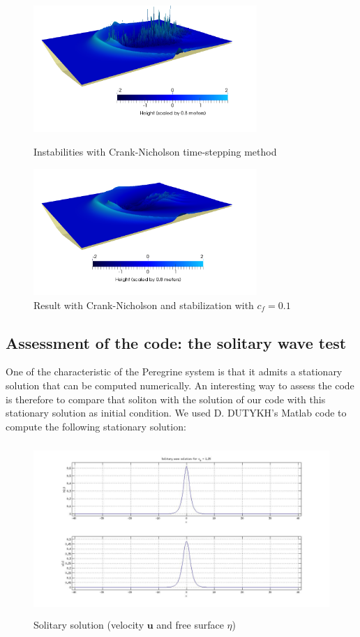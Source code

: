 \documentclass[11pt,a4paper]{article}
\begin{document}
	\begin{figure}[!h]
		\begin{minipage}[t]{0.5\linewidth}
			\centering
			\includegraphics[height=4.8cm]{Instabilities.png}
			\caption{Instabilities with Crank-Nicholson time-stepping method}
		\end{minipage}
		\hspace{10pt}
		\begin{minipage}[t]{0.5\linewidth}
			\centering
			\includegraphics[height=4.8cm]{InstabilitiesCorrection.png}
			\caption{Result with Crank-Nicholson and stabilization with $c_f = 0.1$}
		\end{minipage}
	\end{figure}
		
\subsection{Assessment of the code: the solitary wave test}	
	One of the characteristic of the Peregrine system is that it admits a stationary solution that can be computed numerically. An interesting way to assess the code is therefore to compare that soliton with the solution of our code with this stationary solution as initial condition. We used D. DUTYKH's Matlab code to compute the following stationary solution: 
	\begin{figure}[!h]
		\centering
		\includegraphics[height=6.5cm]{PeregrineSolitonSolution.jpg}
		\caption{Solitary solution (velocity $\mathbf{u}$ and free surface $\eta$)}
	\end{figure}		
			
\end{document}
